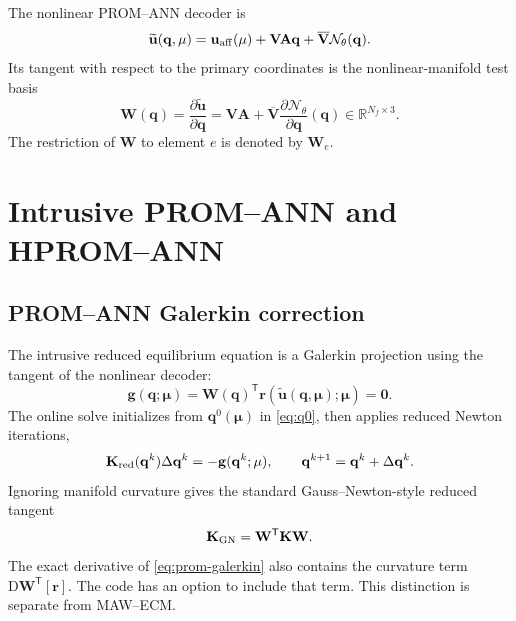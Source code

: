 \documentclass[11pt,a4paper]{article}
\newcommand{\R}{\mathbb{R}}
\newcommand{\transpose}{^{\mathsf T}}
\newcommand{\vect}[1]{\mathbf{#1}}
\newcommand{\mat}[1]{\mathbf{#1}}
\begin{document}
The nonlinear PROM--ANN decoder is
\begin{equation}
  \widetilde{\vect u}(\vect q,\vect\mu)
  =\vect u_{\rm aff}(\vect\mu)
   +\mat V\mat A\vect q
   +\overline{\mat V}\mathcal N_\theta(\vect q).
  \label{eq:prom-ann-decoder}
\end{equation}
Its tangent with respect to the primary coordinates is the nonlinear-manifold
test basis
\begin{equation}
  \mat W(\vect q)
  =\frac{\partial\widetilde{\vect u}}{\partial\vect q}
  =\mat V\mat A
   +\overline{\mat V}
    \frac{\partial\mathcal N_\theta}{\partial\vect q}(\vect q)
  \in\R^{N_f\times3}.
  \label{eq:W}
\end{equation}
The restriction of \(\mat W\) to element \(e\) is denoted by \(\mat W_e\).

\section{Intrusive PROM--ANN and HPROM--ANN}
\label{sec:hprom}

\subsection{PROM--ANN Galerkin correction}

The intrusive reduced equilibrium equation is a Galerkin projection using the
tangent of the nonlinear decoder:
\begin{equation}
  \vect g(\vect q;\vect\mu)
  =\mat W(\vect q)\transpose
    \vect r\!\left(\widetilde{\vect u}(\vect q,\vect\mu);\vect\mu\right)
  =\vect0.
  \label{eq:prom-galerkin}
\end{equation}
The online solve initializes from \(\vect q^0(\vect\mu)\) in
\cref{eq:q0}, then applies reduced Newton iterations,
\begin{equation}
  \mat K_{\rm red}(\vect q^k)\Delta\vect q^k
  =-\vect g(\vect q^k;\vect\mu),
  \qquad
  \vect q^{k+1}=\vect q^k+\Delta\vect q^k.
  \label{eq:reduced-newton}
\end{equation}
Ignoring manifold curvature gives the standard Gauss--Newton-style reduced
tangent
\begin{equation}
  \mat K_{\rm GN}
  =\mat W\transpose\mat K\mat W.
  \label{eq:gn-tangent}
\end{equation}
The exact derivative of \cref{eq:prom-galerkin} also contains the curvature
term \(\mathrm D\mat W\transpose[\vect r]\).  The code has an option to
include that term.  This distinction is separate from MAW--ECM.
\end{document}
